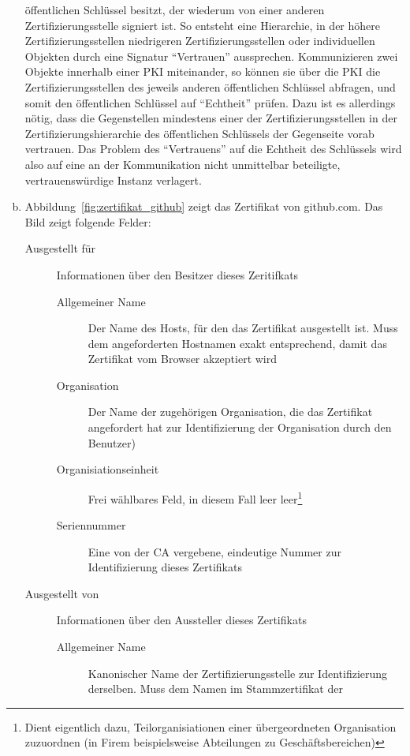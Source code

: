 \documentclass[11pt,a4paper]{scrartcl}
\begin{document}
\begin{enumerate}[a)]
  öffentlichen Schlüssel besitzt, der wiederum von einer anderen
  Zertifizierungsstelle signiert ist.  So entsteht eine Hierarchie, in der
  höhere Zertifizierungsstellen niedrigeren Zertifizierungsstellen oder
  individuellen Objekten durch eine Signatur \enquote{Vertrauen} aussprechen.
  Kommunizieren zwei Objekte innerhalb einer PKI miteinander, so können sie
  über die PKI die Zertifizierungsstellen des jeweils anderen öffentlichen
  Schlüssel abfragen, und somit den öffentlichen Schlüssel auf
  \enquote{Echtheit} prüfen.  Dazu ist es allerdings nötig, dass die
  Gegenstellen mindestens einer der Zertifizierungsstellen in der
  Zertifizierungshierarchie des öffentlichen Schlüssels der Gegenseite vorab
  vertrauen.  Das Problem des \enquote{Vertrauens} auf die Echtheit des
  Schlüssels wird also auf eine an der Kommunikation nicht unmittelbar
  beteiligte, vertrauenswürdige Instanz verlagert.
\item Abbildung~\ref{fig:zertifikat_github} zeigt das Zertifikat von
  github.com.  Das Bild zeigt folgende Felder:
  \begin{description}
    \item[Ausgestellt für] Informationen über den Besitzer dieses Zeritifkats
      \begin{description}
      \item[Allgemeiner Name] Der Name des Hosts, für den das Zertifikat
        ausgestellt ist.  Muss dem angeforderten Hostnamen exakt entsprechend,
        damit das Zertifikat vom Browser akzeptiert wird
      \item[Organisation] Der Name der zugehörigen Organisation, die das
        Zertifikat angefordert hat zur Identifizierung der Organisation durch
        den Benutzer)
      \item[Organisiationseinheit] Frei wählbares Feld, in diesem Fall leer
        leer\footnote{Dient eigentlich dazu, Teilorganisiationen einer
          übergeordneten Organisation zuzuordnen (in Firem beispielsweise
          Abteilungen zu Geschäftsbereichen)}
      \item[Seriennummer] Eine von der CA vergebene, eindeutige Nummer zur
        Identifizierung dieses Zertifikats
    \end{description}
  \item[Ausgestellt von] Informationen über den Aussteller dieses Zertifikats
    \begin{description}
    \item[Allgemeiner Name] Kanonischer Name der Zertifizierungsstelle zur
      Identifizierung derselben.  Muss dem Namen im Stammzertifikat der

\end{description}
\end{description}
\end{enumerate}
\end{document}
